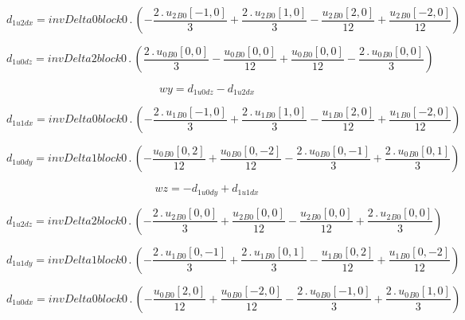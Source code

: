 \documentclass{article}
\begin{document}
\begin{dmath}d_{1 u2 dx} = invDelta0block0 \,.\, \left(- \frac{2 \,.\, {u_{2}{_{B0}}}[{-1,0}]}{3} + \frac{2 \,.\, {u_{2}{_{B0}}}[{1,0}]}{3} - \frac{{u_{2}{_{B0}}}[{2,0}]}{12} + \frac{{u_{2}{_{B0}}}[{-2,0}]}{12}\right)\end{dmath}

\begin{dmath}d_{1 u0 dz} = invDelta2block0 \,.\, \left(\frac{2 \,.\, {u_{0}{_{B0}}}[{0,0}]}{3} - \frac{{u_{0}{_{B0}}}[{0,0}]}{12} + \frac{{u_{0}{_{B0}}}[{0,0}]}{12} - \frac{2 \,.\, {u_{0}{_{B0}}}[{0,0}]}{3}\right)\end{dmath}

\begin{dmath}wy = d_{1 u0 dz} - d_{1 u2 dx}\end{dmath}

\begin{dmath}d_{1 u1 dx} = invDelta0block0 \,.\, \left(- \frac{2 \,.\, {u_{1}{_{B0}}}[{-1,0}]}{3} + \frac{2 \,.\, {u_{1}{_{B0}}}[{1,0}]}{3} - \frac{{u_{1}{_{B0}}}[{2,0}]}{12} + \frac{{u_{1}{_{B0}}}[{-2,0}]}{12}\right)\end{dmath}

\begin{dmath}d_{1 u0 dy} = invDelta1block0 \,.\, \left(- \frac{{u_{0}{_{B0}}}[{0,2}]}{12} + \frac{{u_{0}{_{B0}}}[{0,-2}]}{12} - \frac{2 \,.\, {u_{0}{_{B0}}}[{0,-1}]}{3} + \frac{2 \,.\, {u_{0}{_{B0}}}[{0,1}]}{3}\right)\end{dmath}

\begin{dmath}wz = - d_{1 u0 dy} + d_{1 u1 dx}\end{dmath}

\begin{dmath}d_{1 u2 dz} = invDelta2block0 \,.\, \left(- \frac{2 \,.\, {u_{2}{_{B0}}}[{0,0}]}{3} + \frac{{u_{2}{_{B0}}}[{0,0}]}{12} - \frac{{u_{2}{_{B0}}}[{0,0}]}{12} + \frac{2 \,.\, {u_{2}{_{B0}}}[{0,0}]}{3}\right)\end{dmath}

\begin{dmath}d_{1 u1 dy} = invDelta1block0 \,.\, \left(- \frac{2 \,.\, {u_{1}{_{B0}}}[{0,-1}]}{3} + \frac{2 \,.\, {u_{1}{_{B0}}}[{0,1}]}{3} - \frac{{u_{1}{_{B0}}}[{0,2}]}{12} + \frac{{u_{1}{_{B0}}}[{0,-2}]}{12}\right)\end{dmath}

\begin{dmath}d_{1 u0 dx} = invDelta0block0 \,.\, \left(- \frac{{u_{0}{_{B0}}}[{2,0}]}{12} + \frac{{u_{0}{_{B0}}}[{-2,0}]}{12} - \frac{2 \,.\, {u_{0}{_{B0}}}[{-1,0}]}{3} + \frac{2 \,.\, {u_{0}{_{B0}}}[{1,0}]}{3}\right)\end{dmath}
\end{document}
